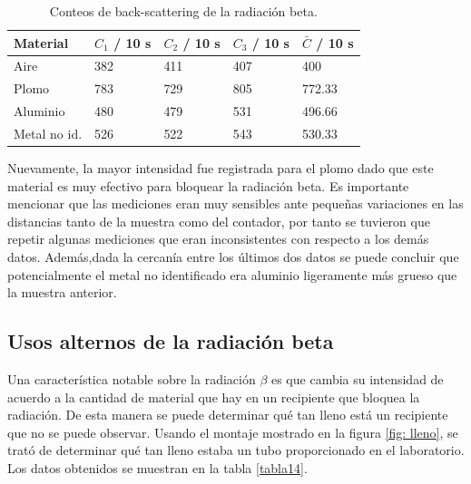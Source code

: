\documentclass[prb,aps,twocolumn,preprintnumbers,amsmath,amssymb]{revtex4}
\begin{document}
\begin{table}[h!]
	\caption{\label{tabla13}Conteos de back-scattering de la radiación beta.}
	\begin{ruledtabular}
		\begin{tabular}{|M{1.5cm}|M{1.5cm}|M{1.5cm}|M{1.5cm}|M{1.5cm}|}
			Material & $C_{1}$ / 10 s & $C_{2}$ / 10 s & $C_{3}$ / 10 s & $\bar{C}$ / 10 s\\
			\hline
			Aire & 382 & 411 & 407 & 400\\\hline
			Plomo & 783 & 729 & 805 & 772.33\\\hline
			Aluminio & 480 & 479 & 531 & 496.66\\\hline
			Metal no id. & 526 & 522 & 543 & 530.33\\
		\end{tabular}
	\end{ruledtabular}
\end{table}
 
Nuevamente, la mayor intensidad fue registrada para el plomo dado que este material es muy efectivo para bloquear la radiación beta. Es importante mencionar que las mediciones eran muy sensibles ante pequeñas variaciones en las distancias tanto de la muestra como del contador, por tanto se tuvieron que repetir algunas mediciones que eran inconsistentes con respecto a los demás datos. Además,dada la cercanía entre los últimos dos datos se puede concluir que potencialmente el metal no identificado era aluminio ligeramente más grueso que la muestra anterior.

\subsection{Usos alternos de la radiación beta}

Una característica notable sobre la radiación $\beta$ es que cambia  su intensidad de acuerdo a la cantidad de material que hay en un recipiente que bloquea la radiación. De esta manera se puede determinar qué tan lleno está un recipiente que no se puede observar. Usando el montaje mostrado en la figura \ref{fig: lleno}, se trató de determinar qué tan lleno estaba un tubo proporcionado en el laboratorio.\\



Los datos obtenidos se muestran en la tabla \ref{tabla14}.
\end{document}
